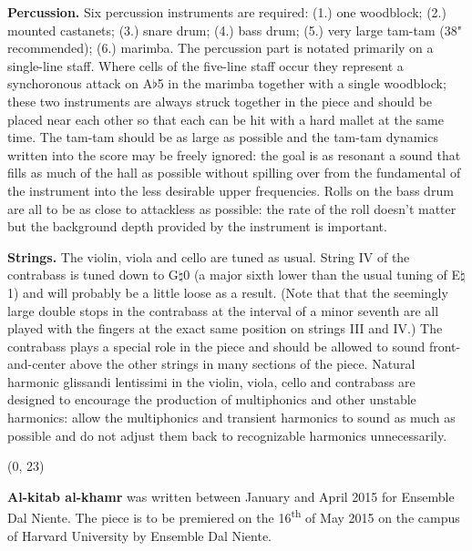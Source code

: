 \documentclass[10pt]{article}
\begin{document}
\begin{textblock}{23}
\textbf{Percussion.} Six percussion instruments are required: (1.) one
woodblock; (2.) mounted castanets; (3.) snare drum; (4.) bass drum; (5.) very
large tam-tam (38" recommended); (6.) marimba. The percussion part is notated
primarily on a single-line staff. Where cells of the five-line staff occur they
represent a synchoronous attack on A$\flat$5 in the marimba together with a
single woodblock; these two instruments are always struck together in the piece
and should be placed near each other so that each can be hit with a hard mallet
at the same time. The tam-tam should be as large as possible and the tam-tam
dynamics written into the score may be freely ignored: the goal is as resonant
a sound that fills as much of the hall as possible without spilling over from
the fundamental of the instrument into the less desirable upper frequencies.
Rolls on the bass drum are all to be as close to attackless as possible: the
rate of the roll doesn't matter but the background depth provided by the
instrument is important.

\textbf{Strings.} The violin, viola and cello are tuned as usual. String IV of
the contrabass is tuned down to G$\natural$0 (a major sixth lower than the
usual tuning of E$\natural$1) and will probably be a little loose as a result.
(Note that that the seemingly large double stops in the contrabass at the
interval of a minor seventh are all played with the fingers at the exact same
position on strings III and IV.) The contrabass plays a special role in the
piece and should be allowed to sound front-and-center above the other strings
in many sections of the piece. Natural harmonic glissandi lentissimi in the
violin, viola, cello and contrabass are designed to encourage the production of
multiphonics and other unstable harmonics: allow the multiphonics and transient
harmonics to sound as much as possible and do not adjust them back to
recognizable harmonics unnecessarily.

\end{textblock}

\begin{textblock}{23}(0, 23)

\textbf{Al-kitab al-khamr} was written between January and April 2015 for
Ensemble Dal Niente. The piece is to be premiered on the 16\textsuperscript{th}
of May 2015 on the campus of Harvard University by Ensemble Dal Niente.

\end{textblock}
\end{document}
